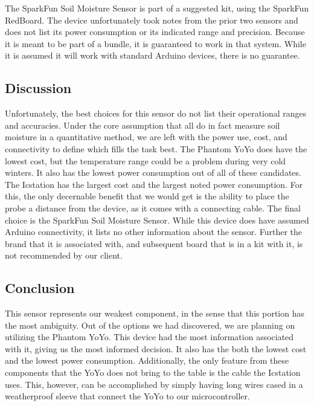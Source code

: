 \documentclass[IEEEtran,letterpaper,10pt,titlepage,fleqn,draftclsnofoot,onecolumn]{article}
\begin{document}
\vspace{1mm}

The SparkFun Soil Moisture Sensor is part of a suggested kit, using the SparkFun RedBoard. The device unfortunately took notes from the prior two sensors and does not list its power consumption or its indicated range and precision. Because it is meant to be part of a bundle, it is guaranteed to work in that system. While it is assumed it will work with standard Arduino devices, there is no guarantee.

\subsection{Discussion}

Unfortunately, the best choices for this sensor do not list their operational ranges and accuracies. Under the core assumption that all do in fact measure soil moisture in a quantitative method, we are left with the power use, cost, and connectivity to define which fills the task best. The Phantom YoYo does have the lowest cost, but the temperature range could be a problem during very cold winters. It also has the lowest power consumption out of all of these candidates. The Icstation has the largest cost and the largest noted power consumption. For this, the only decernable benefit that we would get is the ability to place the probe a distance from the device, as it comes with a connecting cable. The final choice is the SparkFun Soil Moisture Sensor. While this device does have assumed Arduino connectivity, it lists no other information about the sensor. Further the brand that it is associated with, and subsequent board that is in a kit with it, is not recommended by our client.

\clearpage

\subsection{Conclusion}

This sensor represents our weakest component, in the sense that this portion has the most ambiguity. Out of the options we had discovered, we are planning on utilizing the Phantom YoYo. This device had the most information associated with it, giving us the most informed decision. It also has the both the lowest cost and the lowest power consumption. Additionally, the only feature from these components that the YoYo does not bring to the table is the cable the Icstation uses. This, however, can be accomplished by simply having long wires cased in a weatherproof sleeve that connect the YoYo to our microcontroller. 
\end{document}
